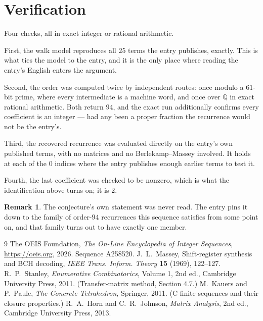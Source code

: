 \documentclass[11pt,a4paper]{article}
\theoremstyle{plain}
\theoremstyle{definition}
\newtheorem{remark}[theorem]{Remark}
\begin{document}
\section{Verification}

Four checks, all in exact integer or rational arithmetic.

First, the walk model reproduces all $25$ terms the entry publishes, exactly. This is
what ties the model to the entry, and it is the only place where reading the entry's English
enters the argument.

Second, the order was computed twice by independent routes: once modulo a $61$-bit prime, where
every intermediate is a machine word, and once over $\mathbb{Q}$ in exact rational arithmetic.
Both return $94$, and the exact run additionally confirms every coefficient is an integer
--- had any been a proper fraction the recurrence would not be the entry's.

Third, the recovered recurrence was evaluated directly on the entry's own published terms, with
no matrices and no Berlekamp--Massey involved. It holds at each of the $0$ indices where
the entry publishes enough earlier terms to test it.

Fourth, the last coefficient was checked to be nonzero, which is what the identification above
turns on; it is $2$.

\begin{remark}
The conjecture's own statement was never read. The entry pins it down to the family of
order-$94$ recurrences this sequence satisfies from some point on, and that family turns
out to have exactly one member.
\end{remark}

\begin{thebibliography}{9}
 The OEIS Foundation, \emph{The On-Line Encyclopedia of Integer
Sequences}, \url{https://oeis.org}, 2026. Sequence A258520.
 J.~L.~Massey, Shift-register synthesis and BCH decoding, \emph{IEEE
Trans. Inform. Theory} \textbf{15} (1969), 122--127.
 R.~P.~Stanley, \emph{Enumerative Combinatorics}, Volume 1, 2nd ed.,
Cambridge University Press, 2011. (Transfer-matrix method, Section 4.7.)
 M.~Kauers and P.~Paule, \emph{The Concrete Tetrahedron}, Springer, 2011.
(C-finite sequences and their closure properties.)
 R.~A.~Horn and C.~R.~Johnson, \emph{Matrix Analysis}, 2nd ed., Cambridge
University Press, 2013.
\end{thebibliography}
\end{document}
